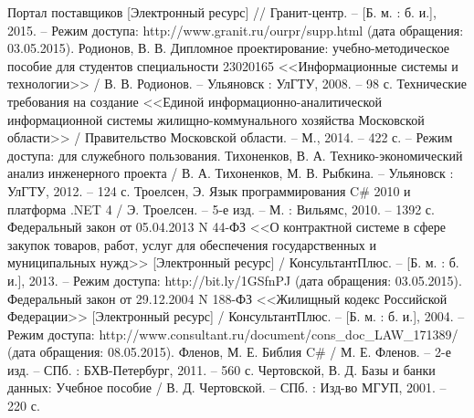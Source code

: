 \begin{thebibliography}{99}
	 Портал поставщиков [Электронный ресурс] // Гранит-центр. – [Б. м. : б. и.], 2015. – Режим доступа: http://www.granit.ru/ourpr/supp.html (дата обращения: 03.05.2015).
	 Родионов, В. В. Дипломное проектирование: учебно-методическое пособие для студентов специальности 23020165 <<Информационные системы и технологии>> / В. В. Родионов. – Ульяновск : УлГТУ, 2008. – 98 с.
	 Технические требования на создание <<Единой информационно-аналитической информационной системы жилищно-коммунального хозяйства Московской области>> / Правительство Московской области. – М., 2014. – 422 с. – Режим доступа: для служебного пользования.
	 Тихоненков, В. А. Технико-экономический анализ инженерного проекта / В. А. Тихоненков, М. В. Рыбкина. – Ульяновск : УлГТУ, 2012. – 124 с.
	 Троелсен, Э. Язык программирования C\# 2010 и платформа .NET 4 / Э. Троелсен. – 5-е изд. – М. : Вильямс, 2010. – 1392 с.
	 Федеральный закон от 05.04.2013 N 44-ФЗ <<О контрактной системе в сфере закупок товаров, работ, услуг для обеспечения государственных и муниципальных нужд>> [Электронный ресурс] / КонсультантПлюс. – [Б. м. : б. и.], 2013. – Режим доступа: http://bit.ly/1GSfnPJ (дата обращения: 03.05.2015).
	 Федеральный закон от 29.12.2004 N 188-ФЗ <<Жилищный кодекс Российской Федерации>> [Электронный ресурс] / КонсультантПлюс. – [Б. м. : б. и.], 2004. – Режим доступа: http://www.consultant.ru/document/cons\_doc\_LAW\_171389/ (дата обращения: 08.05.2015).
	 Фленов, М. Е. Библия C\# / М. Е. Фленов. – 2-е изд. – СПб. : БХВ-Петербург, 2011. – 560 с.
	 Чертовской, В. Д. Базы и банки данных: Учебное пособие / В. Д. Чертовской. – СПб. : Изд-во МГУП, 2001. –  220 с.
\end{thebibliography}


\clearpage
\newpage